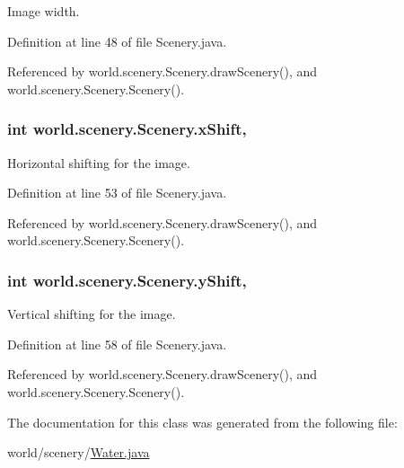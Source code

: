 Image width. 



Definition at line 48 of file Scenery.\-java.



Referenced by world.\-scenery.\-Scenery.\-draw\-Scenery(), and world.\-scenery.\-Scenery.\-Scenery().

\hypertarget{a00024_a0999f105f7630fd67fd9d440da6983aa}{
\subsubsection[{x\-Shift}]{\setlength{\rightskip}{0pt plus 5cm}int world.\-scenery.\-Scenery.\-x\-Shift\hspace{0.3cm}{\ttfamily [protected]}, {\ttfamily [inherited]}}}\label{a00024_a0999f105f7630fd67fd9d440da6983aa}


Horizontal shifting for the image. 



Definition at line 53 of file Scenery.\-java.



Referenced by world.\-scenery.\-Scenery.\-draw\-Scenery(), and world.\-scenery.\-Scenery.\-Scenery().

\hypertarget{a00024_ac9ca2c17cf6920deffe490c013b0e638}{
\subsubsection[{y\-Shift}]{\setlength{\rightskip}{0pt plus 5cm}int world.\-scenery.\-Scenery.\-y\-Shift\hspace{0.3cm}{\ttfamily [protected]}, {\ttfamily [inherited]}}}\label{a00024_ac9ca2c17cf6920deffe490c013b0e638}


Vertical shifting for the image. 



Definition at line 58 of file Scenery.\-java.



Referenced by world.\-scenery.\-Scenery.\-draw\-Scenery(), and world.\-scenery.\-Scenery.\-Scenery().



The documentation for this class was generated from the following file\-:\begin{DoxyCompactItemize}
\item 
world/scenery/\hyperlink{a00077}{Water.\-java}\end{DoxyCompactItemize}
